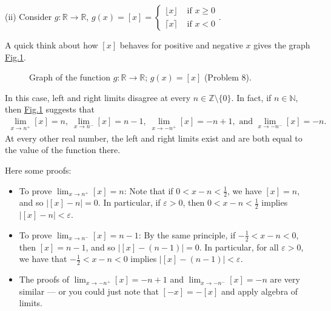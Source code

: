 \documentclass[letterpaper,10pt,english]{jupyterBook}
\let\sphinxpxdimen\pdfpxdimen\else\newdimen\sphinxpxdimen
\begin{document}
\sphinxAtStartPar
(ii) Consider \(g:\mathbb{R}\to\mathbb{R}\), \(g(x) = [x] = \left\{\begin{array}{cl} \lfloor x\rfloor & \text{ if } x\geq 0 \\ \lceil x \rceil & \text{ if } x<0 \end{array}\right.\).

\sphinxAtStartPar
A quick think about how \([x]\) behaves for positive and negative \(x\) gives the graph \hyperref[\detokenize{Solutions-full:intx}]{Fig.\@ \ref{\detokenize{Solutions-full:intx}}}.

\begin{figure}[htbp]
\centering
\capstart

\noindent\sphinxincludegraphics[width=400\sphinxpxdimen]{{[x]}.png}
\caption{Graph of the function \(g:\mathbb{R}\to\mathbb{R}\); \(g(x)=[x]\) (Problem 8).}\label{\detokenize{Solutions-full:intx}}\end{figure}

\sphinxAtStartPar
In this case, left and right limits disagree at every \(n \in \mathbb{Z}\setminus\{0\}\). In fact, if \(n\in\mathbb{N}\), then \hyperref[\detokenize{Solutions-full:intx}]{Fig.\@ \ref{\detokenize{Solutions-full:intx}}} suggests that
\begin{equation*}
\begin{split}
\lim_{x\rightarrow n^+}[x]=n, \;\lim_{x\rightarrow n^-}[x]=n-1, \; \lim_{x\rightarrow -n^+}[x]= -n+1, \text{ and } \lim_{x\rightarrow -n^-}[x]=-n.
\end{split}
\end{equation*}
\sphinxAtStartPar
At every other real number, the left and right limits exist and are both equal to the value of the function there.

\sphinxAtStartPar
Here some proofs:
\begin{itemize}
\item {} 
\sphinxAtStartPar
To prove \(\lim_{x \rightarrow n^+}[x] = n\): Note that if \(0<x-n<\frac{1}{2}\), we have \([x]=n\), and so \(|[x]-n|=0\). In particular, if \(\varepsilon>0\), then \(0<x-n<\frac{1}{2}\) implies \(|[x]-n|<\varepsilon\).

\item {} 
\sphinxAtStartPar
To prove \(\lim_{x\rightarrow n^-}[x]=n-1\): By the same principle, if \(-\frac{1}{2}<x-n<0\), then \([x]=n-1\), and so \(|[x]-(n-1)|=0\). In particular, for all \(\varepsilon>0\), we have that \(-\frac{1}{2}<x-n<0\) implies \(|[x]-(n-1)|<\varepsilon\).

\item {} 
\sphinxAtStartPar
The proofs of \(\lim_{x\rightarrow -n^+}[x]= -n+1\) and \(\lim_{x\rightarrow -n^-}[x]=-n\) are very similar — or you could just note that \([-x]=-[x]\) and apply algebra of limits.

\end{itemize}
\end{document}
